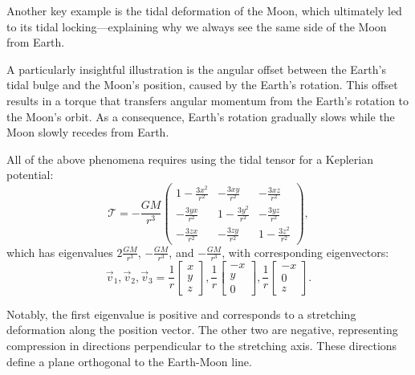             Another key example is the tidal deformation of the Moon, which ultimately led to its tidal locking—explaining why we always see the same side of the Moon from Earth.

            A particularly insightful illustration is the angular offset between the Earth's tidal bulge and the Moon's position, caused by the Earth's rotation. This offset results in a torque that transfers angular momentum from the Earth's rotation to the Moon's orbit. As a consequence, Earth's rotation gradually slows while the Moon slowly recedes from Earth. 
            
            All of the above phenomena requires using the tidal tensor for a Keplerian potential:
            \begin{equation}
                \mathcal{T}= -\frac{GM}{r^3}\left(\begin{matrix}
                    1-\frac{3x^2}{r^2} & -\frac{3xy}{r^2} & -\frac{3xz}{r^2} \\
                    -\frac{3yx}{r^2} & 1-\frac{3y^2}{r^2} & -\frac{3yz}{r^2} \\
                    -\frac{3zx}{r^2} & -\frac{3zy}{r^2} & 1-\frac{3z^2}{r^2}
                \end{matrix}\right),
            \end{equation}
            which has eigenvalues $2\frac{GM}{r^3}$, $-\frac{GM}{r^3}$, and $-\frac{GM}{r^3}$, with corresponding eigenvectors:
            \begin{equation}
                \vec{v}_1,\vec{v}_2,\vec{v}_3 = \dfrac{1}{r}\begin{bmatrix} x \\ y \\ z \end{bmatrix}, \dfrac{1}{r}\begin{bmatrix} -x \\ y \\ 0 \end{bmatrix}, \dfrac{1}{r}\begin{bmatrix} -x \\ 0 \\ z \end{bmatrix}.
            \end{equation}

            Notably, the first eigenvalue is positive and corresponds to a stretching deformation along the position vector. The other two are negative, representing compression in directions perpendicular to the stretching axis. These directions define a plane orthogonal to the Earth-Moon line. 
            
